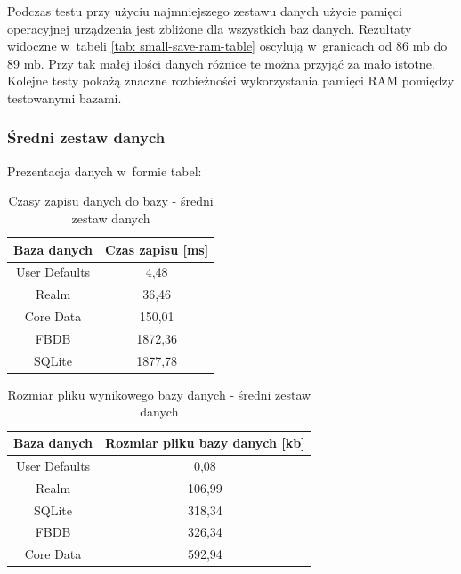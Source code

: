 Podczas testu przy użyciu najmniejszego zestawu danych użycie pamięci operacyjnej urządzenia jest zbliżone dla wszystkich baz danych. Rezultaty widoczne w~tabeli \ref{tab: small-save-ram-table} oscylują w~granicach od 86 mb do 89 mb. Przy tak małej ilości danych różnice te można przyjąć za mało istotne. Kolejne testy pokażą znaczne rozbieżności wykorzystania pamięci RAM pomiędzy testowanymi bazami.

\newpage

\subsubsection{Średni zestaw danych}

Prezentacja danych w~formie tabel: 

\begin{table}[h]
\centering
\caption{Czasy zapisu danych do bazy - średni zestaw danych}
\label{tab: medium-save-time-table}
\begin{tabular}{|c|c|}
\hline
Baza danych   & Czas zapisu [ms] \\ \hline
User Defaults & 4,48             \\ \hline
Realm         & 36,46            \\ \hline
Core Data     & 150,01           \\ \hline
FBDB          & 1872,36          \\ \hline
SQLite        & 1877,78          \\ \hline
\end{tabular}
\end{table}

\begin{table}[h]
\centering
\caption{Rozmiar pliku wynikowego bazy danych - średni zestaw danych}
\label{tab: medium-save-file-size-table}
\begin{tabular}{|c|c|}
\hline
Baza danych   & Rozmiar pliku bazy danych [kb] \\ \hline
User Defaults & 0,08                           \\ \hline
Realm         & 106,99                         \\ \hline
SQLite        & 318,34                         \\ \hline
FBDB          & 326,34                         \\ \hline
Core Data     & 592,94                         \\ \hline
\end{tabular}
\end{table}

